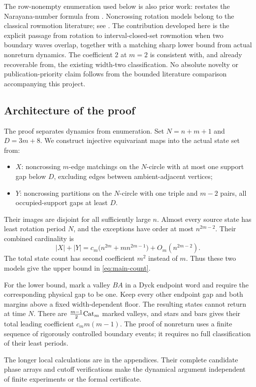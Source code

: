 The row-nonempty enumeration used below is also prior work: \cite[Theorem 2.7, arXiv v1]{ELLMSW} restates the Narayana-number formula from \cite[Theorem 4.4, arXiv v2]{ELMSW}. Noncrossing rotation models belong to the classical rowmotion literature; see \cite{SW}. The contribution developed here is the explicit passage from rotation to interval-closed-set rowmotion when two boundary waves overlap, together with a matching sharp lower bound from actual nonreturn dynamics. The coefficient $2$ at $m=2$ is consistent with, and already recoverable from, the existing width-two classification. No absolute novelty or publication-priority claim follows from the bounded literature comparison accompanying this project.

\subsection{Architecture of the proof}
The proof separates dynamics from enumeration. Set $N=n+m+1$ and $D=3m+8$. We construct injective equivariant maps into the actual state set from:
\begin{itemize}
\item $X$: noncrossing $m$-edge matchings on the $N$-circle with at most one support gap below $D$, excluding edges between ambient-adjacent vertices;
\item $Y$: noncrossing partitions on the $N$-circle with one triple and $m-2$ pairs, all occupied-support gaps at least $D$.
\end{itemize}
Their images are disjoint for all sufficiently large $n$. Almost every source state has least rotation period $N$, and the exceptions have order at most $n^{2m-2}$. Their combined cardinality is
\[
 |X|+|Y|=c_m\bigl(n^{2m}+mn^{2m-1}\bigr)+O_m(n^{2m-2}).
\]
The total state count has second coefficient $m^2$ instead of $m$. Thus these two models give the upper bound in \eqref{eq:main-count}.

For the lower bound, mark a valley $BA$ in a Dyck endpoint word and require the corresponding physical gap to be one. Keep every other endpoint gap and both margins above a fixed width-dependent floor. The resulting states cannot return at time $N$. There are $\frac{m-1}{2}\mathrm{Cat}_m$ marked valleys, and stars and bars gives their total leading coefficient $c_m m(m-1)$. The proof of nonreturn uses a finite sequence of rigorously controlled boundary events; it requires no full classification of their least periods.

The longer local calculations are in the appendices. Their complete candidate phase arrays and cutoff verifications make the dynamical argument independent of finite experiments or the formal certificate.
